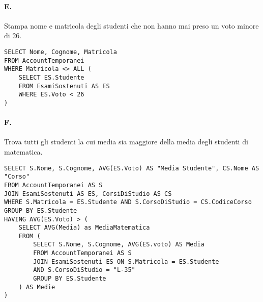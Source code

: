 \newpage
\paragraph{E.}
Stampa nome e matricola degli studenti che non hanno mai preso
un voto minore di 26.

\begin{verbatim}
SELECT Nome, Cognome, Matricola
FROM AccountTemporanei
WHERE Matricola <> ALL (
    SELECT ES.Studente
    FROM EsamiSostenuti AS ES
    WHERE ES.Voto < 26
)
\end{verbatim}

\paragraph{F.}
Trova tutti gli studenti la cui media sia maggiore della media
degli studenti di matematica.

\begin{verbatim}
SELECT S.Nome, S.Cognome, AVG(ES.Voto) AS "Media Studente", CS.Nome AS "Corso"
FROM AccountTemporanei AS S
JOIN EsamiSostenuti AS ES, CorsiDiStudio AS CS
WHERE S.Matricola = ES.Studente AND S.CorsoDiStudio = CS.CodiceCorso
GROUP BY ES.Studente
HAVING AVG(ES.Voto) > (
    SELECT AVG(Media) as MediaMatematica
	FROM (
        SELECT S.Nome, S.Cognome, AVG(ES.voto) AS Media
		FROM AccountTemporanei AS S
		JOIN EsamiSostenuti ES ON S.Matricola = ES.Studente
        AND S.CorsoDiStudio = "L-35"
		GROUP BY ES.Studente
	) AS Medie
)
\end{verbatim}
